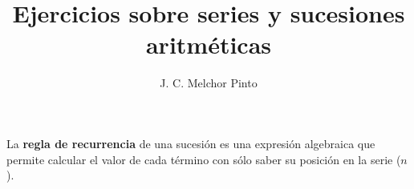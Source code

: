 \documentclass[12pt]{guia}
\title{Ejercicios sobre series y sucesiones aritméticas}
\author{J. C. Melchor Pinto}
\begin{document}
\pagestyle{headandfoot}
\addpoints
\INFO
\vspace{-2em}
\begin{multicols}{2}
    
    
    \columnbreak
    
    
\end{multicols}
\begin{importantbox}
    La \textbf{regla de recurrencia} de una sucesión es una expresión algebraica que permite calcular el valor de cada término con sólo saber su posición en la serie ($n$).
\end{importantbox}
\newpage
\begin{questions}
    \questionboxed[10]{}
    \questionboxed[10]{}
    \questionboxed[10]{}
    \questionboxed[10]{}
    \questionboxed[10]{}
    \questionboxed[10]{}
    \questionboxed[10]{}
    \questionboxed[10]{}
    \questionboxed[10]{}
    \questionboxed[10]{}
\end{questions}

\end{document}
